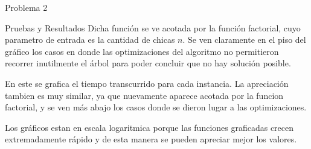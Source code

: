\begin{section}{Problema 2}
\begin{subsection}{Pruebas y Resultados}
		Dicha función se ve acotada por la función factorial, cuyo parametro de entrada es la cantidad de chicas $n$. Se ven claramente en el piso del gráfico los casos en donde las optimizaciones del algoritmo no permitieron recorrer inutilmente el árbol para poder concluir que no hay solución posible.

		\VSP

		En este se grafica el tiempo transcurrido para cada instancia. La apreciación tambien es muy similar, ya que nuevamente aparece acotada por la funcion factorial, y se ven más abajo los casos donde se dieron lugar a las optimizaciones.		

		Los gráficos estan en escala logaritmica porque las funciones graficadas crecen extremadamente rápido y de esta manera se pueden apreciar mejor los valores.
		
	\end{subsection}
\end{section}

